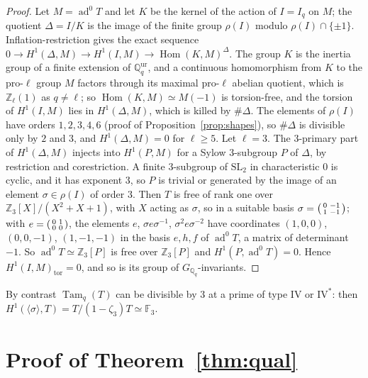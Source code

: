 \documentclass[11pt]{amsart}
\theoremstyle{definition}
\newcommand{\Q}{\mathbb{Q}}
\newcommand{\Z}{\mathbb{Z}}
\newcommand{\F}{\mathbb{F}}
\newcommand{\ad}{\operatorname{ad}^0}
\newcommand{\Tam}{\operatorname{Tam}}
\newcommand{\SL}{\mathrm{SL}}
\begin{document}
\begin{proof}
Let $M=\ad T$ and let $K$ be the kernel of the action of $I=I_q$ on $M$; the quotient $\Delta=I/K$ is the image of the finite group $\rho(I)$ modulo $\rho(I)\cap\{\pm1\}$. Inflation-restriction gives the exact sequence $0\to H^1(\Delta,M)\to H^1(I,M)\to\operatorname{Hom}(K,M)^\Delta$. The group $K$ is the inertia group of a finite extension of $\Q_q^{\mathrm{ur}}$, and a continuous homomorphism from $K$ to the pro-$\ell$ group $M$ factors through its maximal pro-$\ell$ abelian quotient, which is $\Z_\ell(1)$ as $q\ne\ell$; so $\operatorname{Hom}(K,M)\simeq M(-1)$ is torsion-free, and the torsion of $H^1(I,M)$ lies in $H^1(\Delta,M)$, which is killed by $\#\Delta$. The elements of $\rho(I)$ have orders $1,2,3,4,6$ (proof of Proposition~\ref{prop:shapes}), so $\#\Delta$ is divisible only by $2$ and $3$, and $H^1(\Delta,M)=0$ for $\ell\ge5$. Let $\ell=3$. The $3$-primary part of $H^1(\Delta,M)$ injects into $H^1(P,M)$ for a Sylow $3$-subgroup $P$ of $\Delta$, by restriction and corestriction. A finite $3$-subgroup of $\SL_2$ in characteristic $0$ is cyclic, and it has exponent $3$, so $P$ is trivial or generated by the image of an element $\sigma\in\rho(I)$ of order $3$. Then $T$ is free of rank one over $\Z_3[X]/(X^2+X+1)$, with $X$ acting as $\sigma$, so in a suitable basis $\sigma=\begin{psmallmatrix}0&-1\\1&-1\end{psmallmatrix}$; with $e=\begin{psmallmatrix}0&1\\0&0\end{psmallmatrix}$, the elements $e$, $\sigma e\sigma^{-1}$, $\sigma^2e\sigma^{-2}$ have coordinates $(1,0,0)$, $(0,0,-1)$, $(1,-1,-1)$ in the basis $e,h,f$ of $\ad T$, a matrix of determinant $-1$. So $\ad T\simeq\Z_3[P]$ is free over $\Z_3[P]$ and $H^1(P,\ad T)=0$. Hence $H^1(I,M)_{\mathrm{tor}}=0$, and so is its group of $G_{\Q_q}$-invariants.
\end{proof}

By contrast $\Tam_q(T)$ can be divisible by $3$ at a prime of type $\mathrm{IV}$ or $\mathrm{IV}^*$: then $H^1(\langle\sigma\rangle,T)=T/(1-\zeta_3)T\simeq\F_3$.

\section{Proof of Theorem~\ref{thm:qual}}\label{sec:proof}
\end{document}
